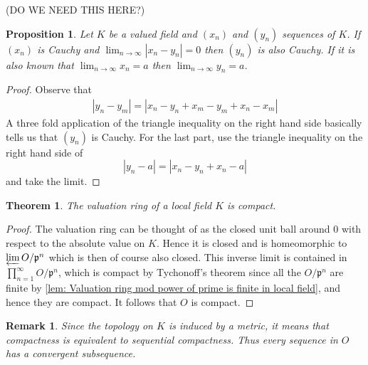 \documentclass{article}
\newtheorem{theorem}{Theorem}[section]
\newtheorem{proposition}{Proposition}[section]
\newtheorem{remark}{Remark}[section]
\newcommand{\mfrak}[1]{\mathfrak{#1}}
\numberwithin{equation}{section}
\begin{document}
(DO WE NEED THIS HERE?)
\begin{proposition}
    Let $K$ be a valued field and $(x_n)$ and $(y_n)$ sequences of $K$. If $(x_n)$ is Cauchy and $\lim_{n \to \infty} |x_n - y_n| = 0$ then $(y_n)$ is also Cauchy. If it is also known that $\lim_{n \to \infty} x_n = a$ then $\lim_{n \to \infty} y_n = a$.
\end{proposition}

\begin{proof}
    Observe that
    \begin{align}
        |y_n - y_m| = |x_n - y_n + x_m - y_m + x_n - x_m|
    \end{align}
    A three fold application of the triangle inequality on the right hand side basically tells us that $(y_n)$ is Cauchy. For the last part, use the triangle inequality on the right hand side of
    $$|y_n - a| = |x_n - y_n + x_n - a|$$
    and take the limit.
\end{proof}





\begin{theorem} \label{thm: Valuation ring in local field is compact}
    The valuation ring of a local field $K$ is compact.
\end{theorem}
\begin{proof}
    The valuation ring can be thought of as the closed unit ball around 0 with respect to the absolute value on $K$. Hence it is closed and is homeomorphic to $\varprojlim O / \mfrak p^n$ which is then of course also closed. This inverse limit is contained in $\prod_{n = 1}^\infty O / \mfrak p^n$, which is compact by Tychonoff's theorem since all the $O / \mfrak p^n$ are finite by \cref{lem: Valuation ring mod power of prime is finite in local field}, and hence they are compact. It follows that $O$ is compact.
\end{proof}
\begin{remark}\label{rem: Compactness is equivalent to sequential compactness}
    Since the topology on $K$ is induced by a metric, it means that compactness is equivalent to sequential compactness. Thus every sequence in $O$ has a convergent subsequence.
\end{remark}
\end{document}
